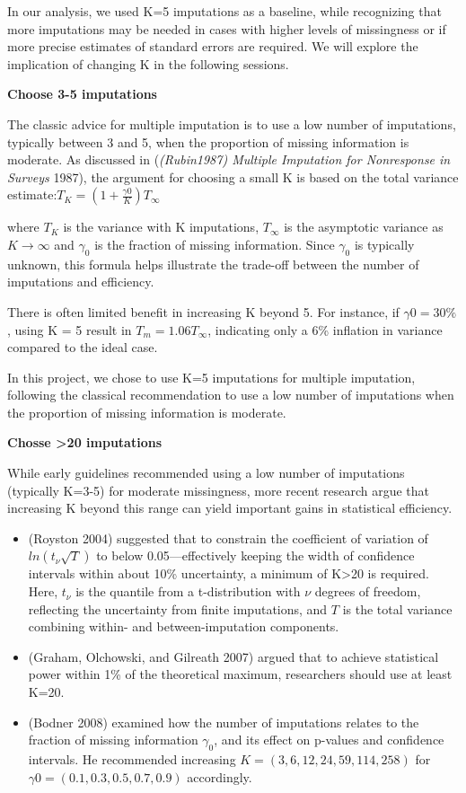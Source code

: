\documentclass{article}
\providecommand{\tightlist}{%
  \setlength{\itemsep}{0pt}\setlength{\parskip}{0pt}}
\begin{document}
In our analysis, we used K=5 imputations as a baseline, while
recognizing that more imputations may be needed in cases with higher
levels of missingness or if more precise estimates of standard errors
are required. We will explore the implication of changing K in the
following sessions.

\textbf{Choose 3-5 imputations}

The classic advice for multiple imputation is to use a low number of
imputations, typically between 3 and 5, when the proportion of missing
information is moderate. As discussed in (\emph{(Rubin1987) Multiple
Imputation for Nonresponse in Surveys} 1987), the argument for choosing
a small K is based on the total variance
estimate:\(T_{K} = (1 + \frac{\gamma0}{K}) T_{\infty}\)

where \(T_{K}\) is the variance with K imputations, \(T_{\infty}\) is
the asymptotic variance as \(K \rightarrow \infty\) and \(\gamma_{0}\)
is the fraction of missing information. Since \(\gamma_{0}\) is
typically unknown, this formula helps illustrate the trade-off between
the number of imputations and efficiency.

There is often limited benefit in increasing K beyond 5. For instance,
if \(\gamma0=30\%\), using K = 5 result in \(T_m=1.06T_\infty\),
indicating only a 6\% inflation in variance compared to the ideal case.

In this project, we chose to use K=5 imputations for multiple
imputation, following the classical recommendation to use a low number
of imputations when the proportion of missing information is moderate.

\textbf{Chosse \textgreater20 imputations}

While early guidelines recommended using a low number of imputations
(typically K=3-5) for moderate missingness, more recent research argue
that increasing K beyond this range can yield important gains in
statistical efficiency.

\begin{itemize}
\tightlist
\item
  (Royston 2004) suggested that to constrain the coefficient of
  variation of \(ln(t_{\nu}\sqrt{T})\) to below 0.05---effectively
  keeping the width of confidence intervals within about 10\%
  uncertainty, a minimum of K\textgreater20 is required. Here,
  \(t_{\nu}\) is the quantile from a t-distribution with \({\nu}\)
  degrees of freedom, reflecting the uncertainty from finite
  imputations, and \(T\) is the total variance combining within- and
  between-imputation components.
\item
  (Graham, Olchowski, and Gilreath 2007) argued that to achieve
  statistical power within 1\% of the theoretical maximum, researchers
  should use at least K=20.
\item
  (Bodner 2008) examined how the number of imputations relates to the
  fraction of missing information \(\gamma_{0}\), and its effect on
  p-values and confidence intervals. He recommended increasing
  \(K=(3,6,12,24,59,114,258)\) for \(\gamma0=(0.1, 0.3, 0.5, 0.7, 0.9)\)
  accordingly.
\end{itemize}
\end{document}
